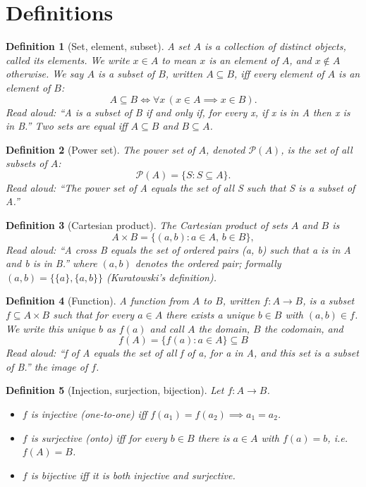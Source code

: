 \documentclass[11pt]{article}
\newtheorem{definition}{Definition}
\begin{document}
\section*{Definitions}

\begin{definition}[Set, element, subset]
A \emph{set} $A$ is a collection of distinct objects, called its \emph{elements}. We write $x \in A$ to mean $x$ is an element of $A$, and $x \notin A$ otherwise. We say $A$ is a \emph{subset} of $B$, written $A \subseteq B$, iff every element of $A$ is an element of $B$:
\[
A \subseteq B \iff \forall x \, (x \in A \implies x \in B).
\]
\emph{Read aloud:} ``A is a subset of B if and only if, for every x, if x is in A then x is in B.''
Two sets are equal iff $A \subseteq B$ and $B \subseteq A$.
\end{definition}

\begin{definition}[Power set]
The \emph{power set} of $A$, denoted $\mathcal{P}(A)$, is the set of all subsets of $A$:
\[
\mathcal{P}(A) = \{ S : S \subseteq A \}.
\]
\emph{Read aloud:} ``The power set of A equals the set of all S such that S is a subset of A.''
\end{definition}

\begin{definition}[Cartesian product]
The \emph{Cartesian product} of sets $A$ and $B$ is
\[
A \times B = \{ (a, b) : a \in A, \, b \in B \},
\]
\emph{Read aloud:} ``A cross B equals the set of ordered pairs (a, b) such that a is in A and b is in B.''
where $(a, b)$ denotes the ordered pair; formally $(a, b) = \{\{a\}, \{a, b\}\}$ (Kuratowski's definition).
\end{definition}

\begin{definition}[Function]
A \emph{function} from $A$ to $B$, written $f : A \to B$, is a subset $f \subseteq A \times B$ such that for every $a \in A$ there exists a unique $b \in B$ with $(a, b) \in f$. We write this unique $b$ as $f(a)$ and call $A$ the \emph{domain}, $B$ the \emph{codomain}, and
\[
f(A) = \{ f(a) : a \in A \} \subseteq B
\]
\emph{Read aloud:} ``f of A equals the set of all f of a, for a in A, and this set is a subset of B.''
the \emph{image} of $f$.
\end{definition}

\begin{definition}[Injection, surjection, bijection]
Let $f : A \to B$.
\begin{itemize}
  \item $f$ is \emph{injective} (one-to-one) iff $f(a_1) = f(a_2) \implies a_1 = a_2$.
  \item $f$ is \emph{surjective} (onto) iff for every $b \in B$ there is $a \in A$ with $f(a) = b$, i.e.\ $f(A) = B$.
  \item $f$ is \emph{bijective} iff it is both injective and surjective.
\end{itemize}
\end{definition}
\end{document}
